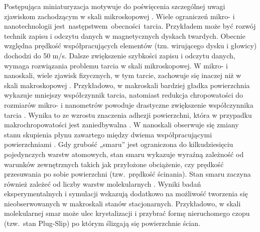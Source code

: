 \documentclass[12pt,a4paper,openright]{report} %
\begin{document}
Postępująca miniaturyzacja motywuje do poświęcenia szczególnej uwagi zjawiskom zachodzącym w skali mikroskopowej \cite{SpringerHandbook}. Wiele ograniczeń mikro- i nanotechnologii jest~następstwem~obecności~tarcia. Przykładem może być rozwój technik zapisu i odczytu danych w magnetycznych dyskach twardych. Obecnie względna prędkość współpracujących elementów (tzn. wirującego dysku i głowicy) dochodzi do 50 m/s. Dalsze zwiększenie szybkości zapisu i odczytu danych, wymaga rozwiązania problemu tarcia w skali mikroskopowej. W mikro- i nanoskali, wiele zjawisk fizycznych, w tym tarcie, zachowuje się inaczej niż w skali makroskopowej \cite{Szlufarska}. Przykładowo, w makroskali bardziej gładka powierzchnia wykazuje mniejszy współczynnik tarcia, natomiast redukcja chropowatości do rozmiarów mikro- i nanometrów powoduje drastyczne zwiększenie współczynnika tarcia \cite{Bowden, Bergli, Borys}. Wynika to ze wzrostu znaczenia adhezji powierzchni, która w przypadku makrochropowatości jest zaniedbywalna \cite{Bowden}. W nanoskali obserwuje się zmiany stanu skupienia płynu zawartego między dwiema współpracującymi powierzchniami \cite{Thompson, DMH1, Gattinoni2013}. Gdy grubość „smaru” jest ograniczona do kilkudziesięciu  pojedynczych warstw atomowych, stan smaru wykazuje wyraźną zależność od warunków zewnętrznych takich jak przyłożone obciążenie, czy prędkość przesuwania po sobie powierzchni (tzw.~prędkość ścinania). Stan smaru zaczyna również zależeć od liczby warstw molekularnych \cite{CuiCummings2001}. Wyniki badań eksperymentalnych i symulacji wskazują dodatkowo na możliwość tworzenia się nieobserwowanych w makroskali stanów stacjonarnych. Przykładowo, w skali molekularnej smar może ulec krystalizacji i przybrać formę nieruchomego czopu (tzw.~stan Plug-Slip) po którym ślizgają się powierzchnie ścian.
\end{document}
